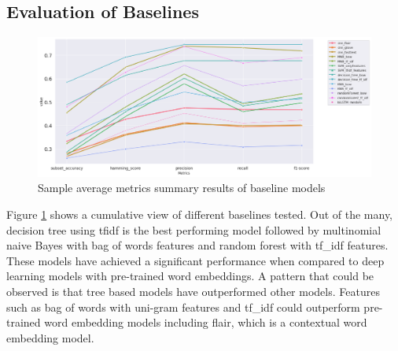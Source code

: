 \subsection{Evaluation of Baselines}
\begin{figure}[h!]
    \centering
    \includegraphics[width=1\textwidth]{thesis/figures/Baslines.png}
    \caption{Sample average metrics summary results of baseline models }
    \label{fig:model_wise_group_baseline}
\end{figure}
Figure \ref{fig:model_wise_group_baseline} shows a cumulative view of different baselines tested. Out of the many, decision tree using \acrshort{tfidf} is the best performing model followed by multinomial naive Bayes with bag of words features and random forest with tf\_idf features. These models have achieved a significant performance when compared to deep learning models with pre-trained word embeddings. A pattern that could be observed is that tree based models have outperformed other models. Features such as bag of words with uni-gram features and tf\_idf could outperform pre-trained word embedding models including flair, which is a contextual word embedding model.  


